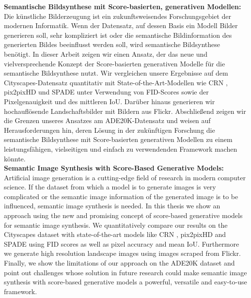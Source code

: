 \noindent\textbf{Semantische Bildsynthese mit Score-basierten, generativen Modellen:}\\[0.3cm]
\noindent Die künstliche Bilderzeugung ist ein zukunftsweisendes Forschungsgebiet der modernen Informatik. Wenn der Datensatz, auf dessen Basis ein Modell Bilder generieren soll, sehr kompliziert ist oder die semantische Bildinformation des generierten Bildes beeinflusst werden soll, wird semantische Bildsynthese benötigt. In dieser Arbeit zeigen wir einen Ansatz, der das neue und vielversprechende Konzept der Score-basierten generativen Modelle für die semantische Bildsynthese nutzt. Wir vergleichen unsere Ergebnisse auf dem Cityscapes-Datensatz \cite{cityscapes} quantitativ mit State-of-the-Art-Modellen wie CRN \cite{crn}, pix2pixHD \cite{pix2pixHD} und SPADE \cite{spade} unter Verwendung von FID-Scores sowie der Pixelgenauigkeit und des mittleren IoU. Darüber hinaus generieren wir hochauflösende Landschaftsbilder mit Bildern aus Flickr. Abschließend zeigen wir die Grenzen unseres Ansatzes am ADE20K-Datensatz \cite{ade20k} und weisen auf Herausforderungen hin, deren Lösung in der zukünftigen Forschung die semantische Bildsynthese mit Score-basierten generativen Modellen zu einem leistungsfähigen, vielseitigen und einfach zu verwendenden Framework machen könnte.\\[0.3cm]
\noindent\textbf{Semantic Image Synthesis with Score-Based Generative Models:}\\[0.3cm]
\noindent Artificial image generation is a cutting-edge field of research in modern computer science. If the dataset from which a model is to generate images is very complicated or the semantic image information of the generated image is to be influenced, semantic image synthesis is needed. In this thesis we show an approach using the new and promising concept of score-based generative models for semantic image synthesis. We quantitatively compare our results on the Cityscapes dataset \cite{cityscapes} with state-of-the-art models like CRN \cite{crn}, pix2pixHD \cite{pix2pixHD} and SPADE \cite{spade} using FID scores as well as pixel accuracy and mean IoU. Furthermore we generate high resolution landscape images using images scraped from Flickr. Finally, we show the limitations of our approach on the ADE20K dataset \cite{ade20k} and point out challenges whose solution in future research could make semantic image synthesis with score-based generative models a powerful, versatile and easy-to-use framework.